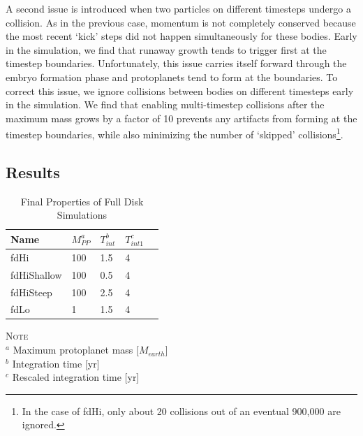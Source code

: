 \documentclass[twocolumn]{aastex63}
\begin{document}
A second issue is introduced when two particles on different timesteps undergo a collision. As in the previous case, momentum is not completely conserved because the most recent `kick' steps did not happen simultaneously for these bodies. Early in the simulation, we find that runaway growth tends to trigger first at the timestep boundaries. Unfortunately, this issue carries itself forward through the embryo formation phase and protoplanets tend to form at the boundaries. To correct this issue, we ignore collisions between bodies on different timesteps early in the simulation. We find that enabling multi-timestep collisions after the maximum mass grows by a factor of 10 prevents any artifacts from forming at the timestep boundaries, while also minimizing the number of `skipped' collisions\footnote{In the case of fdHi, only about 20 collisions out of an eventual 900,000 are ignored.}. 

\subsection{Results}

\begin{table}
\caption{Final Properties of Full Disk Simulations}
\begin{tabular}{lllll} \hline \hline
Name     & $M_{PP}^a$ & $T_{int}^b$ & $T_{int 1}^c$ &  \\ \hline
fdHi                 & 100                                                         & 1.5                              & 4  &  \\
fdHiShallow     & 100                                                        & 0.5                              & 4  &  \\
fdHiSteep       & 100                                                         & 2.5                              & 4 &  \\
fdLo                & 1                                                             & 1.5                              & 4 &  \\ \hline
\end{tabular}
\label{tab:sim_properties}
\begin{flushleft}
\textsc{Note} \\ {$^a$ Maximum protoplanet mass [$M_{earth}$] \\
		       $^b$ Integration time [yr] \\
		       $^c$ Rescaled integration time [yr]} \\
\end{flushleft}
\end{table}
\end{document}
